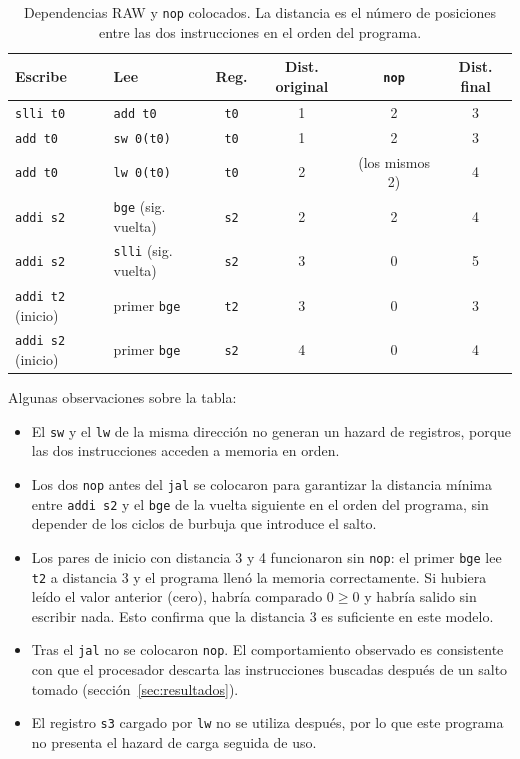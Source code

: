 \documentclass[11pt,a4paper]{article}
\begin{document}
\begin{table}[h]
  \centering
  \small
  \begin{tabular}{@{}llcccc@{}}
    \toprule
    Escribe & Lee & Reg. & Dist. original & \texttt{nop} & Dist. final \\
    \midrule
    \texttt{slli t0}      & \texttt{add t0}        & \texttt{t0} & 1 & 2 & 3 \\
    \texttt{add t0}       & \texttt{sw 0(t0)}      & \texttt{t0} & 1 & 2 & 3 \\
    \texttt{add t0}       & \texttt{lw 0(t0)}      & \texttt{t0} & 2 & (los mismos 2) & 4 \\
    \texttt{addi s2}      & \texttt{bge} (sig. vuelta) & \texttt{s2} & 2 & 2 & 4 \\
    \texttt{addi s2}      & \texttt{slli} (sig. vuelta) & \texttt{s2} & 3 & 0 & 5 \\
    \texttt{addi t2} (inicio) & primer \texttt{bge} & \texttt{t2} & 3 & 0 & 3 \\
    \texttt{addi s2} (inicio) & primer \texttt{bge} & \texttt{s2} & 4 & 0 & 4 \\
    \bottomrule
  \end{tabular}
  \caption{Dependencias RAW y \texttt{nop} colocados. La distancia es el n\'umero de
  posiciones entre las dos instrucciones en el orden del programa.}
  \label{tab:dependencias}
\end{table}

Algunas observaciones sobre la tabla:
\begin{itemize}
  \item El \texttt{sw} y el \texttt{lw} de la misma direcci\'on no generan un
        hazard de registros, porque las dos instrucciones acceden a memoria en
        orden.
  \item Los dos \texttt{nop} antes del \texttt{jal} se colocaron para garantizar
        la distancia m\'inima entre \texttt{addi s2} y el \texttt{bge} de la
        vuelta siguiente en el orden del programa, sin depender de los ciclos
        de burbuja que introduce el salto.
  \item Los pares de inicio con distancia 3 y 4 funcionaron sin \texttt{nop}:
        el primer \texttt{bge} lee \texttt{t2} a distancia 3 y el programa
        llen\'o la memoria correctamente. Si hubiera le\'ido el valor
        anterior (cero), habr\'ia comparado $0 \ge 0$ y habr\'ia salido sin
        escribir nada. Esto confirma que la distancia 3 es suficiente en este
        modelo.
  \item Tras el \texttt{jal} no se colocaron \texttt{nop}. El comportamiento
        observado es consistente con que el procesador descarta las
        instrucciones buscadas despu\'es de un salto tomado
        (secci\'on~\ref{sec:resultados}).
  \item El registro \texttt{s3} cargado por \texttt{lw} no se utiliza despu\'es,
        por lo que este programa no presenta el hazard de carga seguida de
        uso.
\end{itemize}
\end{document}
